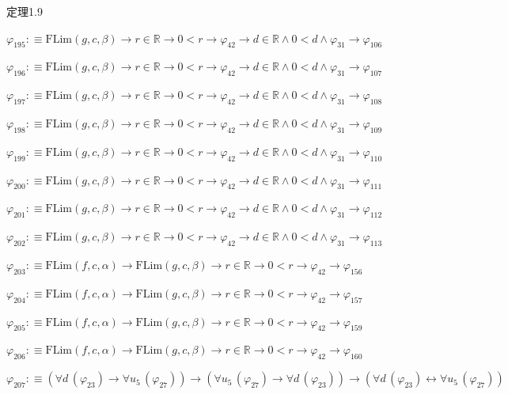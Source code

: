 \begin{fullproof}{定理1.9}
\begin{abbrevlist}
\item $\varphi_{195} :\equiv \mathrm{FLim}(g,c,\beta) \to r \in \mathbb{R} \to 0 < r \to \varphi_{42} \to d \in \mathbb{R} \land 0 < d \land \varphi_{31} \to \varphi_{106}$
\item $\varphi_{196} :\equiv \mathrm{FLim}(g,c,\beta) \to r \in \mathbb{R} \to 0 < r \to \varphi_{42} \to d \in \mathbb{R} \land 0 < d \land \varphi_{31} \to \varphi_{107}$
\item $\varphi_{197} :\equiv \mathrm{FLim}(g,c,\beta) \to r \in \mathbb{R} \to 0 < r \to \varphi_{42} \to d \in \mathbb{R} \land 0 < d \land \varphi_{31} \to \varphi_{108}$
\item $\varphi_{198} :\equiv \mathrm{FLim}(g,c,\beta) \to r \in \mathbb{R} \to 0 < r \to \varphi_{42} \to d \in \mathbb{R} \land 0 < d \land \varphi_{31} \to \varphi_{109}$
\item $\varphi_{199} :\equiv \mathrm{FLim}(g,c,\beta) \to r \in \mathbb{R} \to 0 < r \to \varphi_{42} \to d \in \mathbb{R} \land 0 < d \land \varphi_{31} \to \varphi_{110}$
\item $\varphi_{200} :\equiv \mathrm{FLim}(g,c,\beta) \to r \in \mathbb{R} \to 0 < r \to \varphi_{42} \to d \in \mathbb{R} \land 0 < d \land \varphi_{31} \to \varphi_{111}$
\item $\varphi_{201} :\equiv \mathrm{FLim}(g,c,\beta) \to r \in \mathbb{R} \to 0 < r \to \varphi_{42} \to d \in \mathbb{R} \land 0 < d \land \varphi_{31} \to \varphi_{112}$
\item $\varphi_{202} :\equiv \mathrm{FLim}(g,c,\beta) \to r \in \mathbb{R} \to 0 < r \to \varphi_{42} \to d \in \mathbb{R} \land 0 < d \land \varphi_{31} \to \varphi_{113}$
\item $\varphi_{203} :\equiv \mathrm{FLim}(f,c,\alpha) \to \mathrm{FLim}(g,c,\beta) \to r \in \mathbb{R} \to 0 < r \to \varphi_{42} \to \varphi_{156}$
\item $\varphi_{204} :\equiv \mathrm{FLim}(f,c,\alpha) \to \mathrm{FLim}(g,c,\beta) \to r \in \mathbb{R} \to 0 < r \to \varphi_{42} \to \varphi_{157}$
\item $\varphi_{205} :\equiv \mathrm{FLim}(f,c,\alpha) \to \mathrm{FLim}(g,c,\beta) \to r \in \mathbb{R} \to 0 < r \to \varphi_{42} \to \varphi_{159}$
\item $\varphi_{206} :\equiv \mathrm{FLim}(f,c,\alpha) \to \mathrm{FLim}(g,c,\beta) \to r \in \mathbb{R} \to 0 < r \to \varphi_{42} \to \varphi_{160}$
\item $\varphi_{207} :\equiv (\forall d\,(\varphi_{23}) \to \forall u_{5}\,(\varphi_{27})) \to (\forall u_{5}\,(\varphi_{27}) \to \forall d\,(\varphi_{23})) \to (\forall d\,(\varphi_{23}) \leftrightarrow \forall u_{5}\,(\varphi_{27}))$

\end{abbrevlist}
\end{fullproof}
